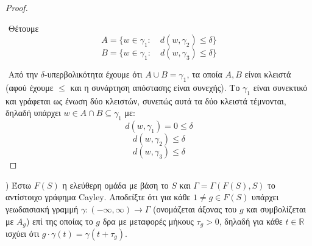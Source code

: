 \documentclass[oneside,a4paper]{article}
\newcommand {\tl}{\textlatin}
\begin{document}
\begin{proof} $ $

    $ $\newline
    Θέτουμε 
    $$A = \{ w \in \gamma_1: \quad d(w,\gamma_2) \leq \delta\}$$
    $$B = \{w \in \gamma_1: \quad d(w,\gamma_3) \leq \delta\}$$

    $ $\newline
    Από την $\delta$-υπερβολικότητα έχουμε ότι $A\cup B = \gamma_1$, τα οποία $A, B$ είναι κλειστά (αφού έχουμε $\leq$ και η συνάρτηση απόστασης είναι συνεχής). Το $\gamma_1$ είναι συνεκτικό και γράφεται ως ένωση δύο κλειστών, συνεπώς αυτά τα δύο κλειστά τέμνονται, δηλαδή υπάρχει $w \in A\cap B \subseteq \gamma_1$ με:
    $$d(w,\gamma_1) = 0 \leq \delta$$
    $$d(w,\gamma_2) \leq \delta$$
    $$d(w,\gamma_3) \leq \delta$$


\end{proof}


\pagebreak

) Έστω $F(S)$ η ελεύθερη ομάδα με βάση το $S$ και $\Gamma = \Gamma(F(S),S)$ το αντίστοιχο γράφημα \tl{Cayley}. Αποδείξτε ότι για κάθε $1 \neq g \in F(S)$ υπάρχει γεωδαισιακή γραμμή $\gamma : (-\infty, \infty) \rightarrow \Gamma$ (ονομάζεται άξονας του $g$ και συμβολίζεται με $A_g$) επί της οποίας το $g$ δρα με μεταφορές μήκους $\tau_g >0$, δηλαδή για κάθε $t \in \mathbb R$ ισχύει ότι $g \cdot \gamma(t) = \gamma(t+\tau_g)$.
\end{document}
